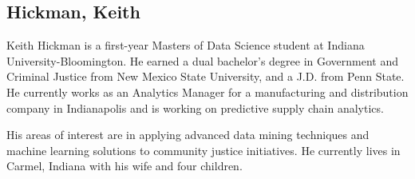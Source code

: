 \subsection{Hickman, Keith}

Keith Hickman is a first-year Masters of Data Science student at Indiana University-Bloomington. He earned a dual bachelor’s degree in Government and Criminal Justice from New Mexico State University, and a J.D. from Penn State. He currently works as an Analytics Manager for a manufacturing and distribution company in Indianapolis and is working on predictive supply chain analytics. 

His areas of interest are in applying advanced data mining techniques and machine learning solutions to community justice initiatives. 
He currently lives in Carmel, Indiana with his wife and four children. 

